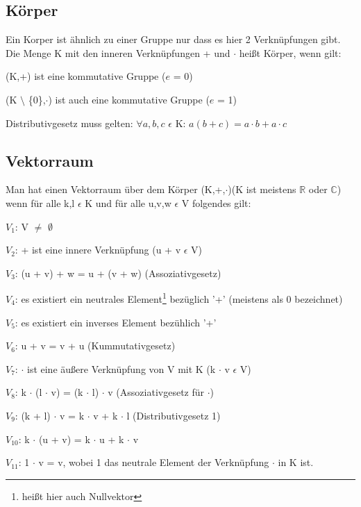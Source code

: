\documentclass[a4paper,10pt]{scrartcl}
\begin{document}
        \subsection{Körper}
            Ein Korper ist ähnlich zu einer Gruppe nur dass es hier 2 Verknüpfungen gibt. Die Menge K mit den inneren Verknüpfungen + und $\cdot$ heißt Körper, wenn gilt:
            \begin{description}
                \item (K,+) ist eine kommutative Gruppe ($e$ = 0)
                \item (K $\setminus$ \{0\},$\cdot$) ist auch eine kommutative Gruppe ($e$ = 1)
                \item Distributivgesetz muss gelten: $\forall a,b,c$ $\epsilon$ K: $a(b + c) = a \cdot b + a \cdot c$
            \end{description}
            \newpage
        \subsection{Vektorraum}
            Man hat einen Vektorraum über dem Körper (K,+,$\cdot$)(K ist meistens $\mathbb{R}$ oder $\mathbb{C}$) 
            wenn für alle k,l $\epsilon$ K und für alle u,v,w $\epsilon$ V folgendes gilt:
            \begin{description}
                \item $V_1$: V $\neq$ $\emptyset$
                \item $V_2$: + ist eine innere Verknüpfung (u + v  $\epsilon$ V)
                \item $V_3$: (u + v) + w = u + (v + w) (Assoziativgesetz)
                \item $V_4$: es existiert ein neutrales Element\footnote{heißt hier auch Nullvektor} bezüglich '+' (meistens als 0 bezeichnet)
                \item $V_5$: es existiert ein inverses Element bezühlich '+' 
                \item $V_6$: u + v = v + u (Kummutativgesetz)
                \item $V_7$: $\cdot$ ist eine äußere Verknüpfung von V mit K (k $\cdot$ v $\epsilon$ V)
                \item $V_8$: k $\cdot$ (l $\cdot$ v) = (k $\cdot$ l) $\cdot$ v (Assoziativgesetz für $\cdot$)
                \item $V_9$: (k + l) $\cdot$ v = k $\cdot$ v + k $\cdot$ l (Distributivgesetz 1)
                \item $V_{10}$: k $\cdot$ (u + v) = k $\cdot$ u + k $\cdot$ v
                \item $V_{11}$: 1 $\cdot$ v = v, wobei 1 das neutrale Element der Verknüpfung $\cdot$ in K ist.
            \end{description} 
\end{document}
